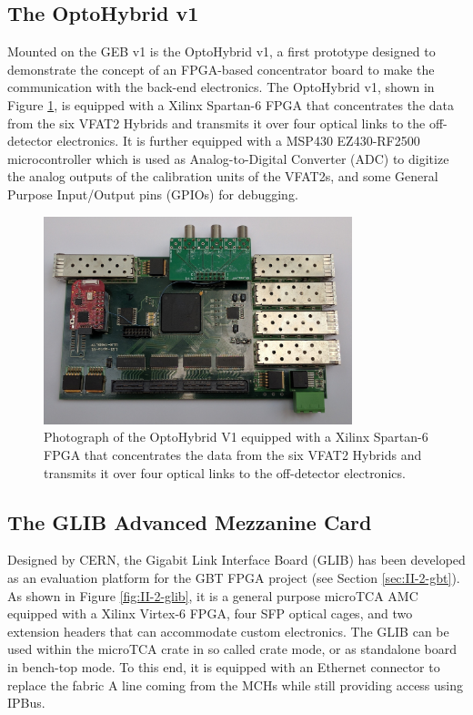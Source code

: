     \subsection{The OptoHybrid v1}

      Mounted on the GEB v1 is the OptoHybrid v1, a first prototype designed to demonstrate the concept of an FPGA-based concentrator board to make the communication with the back-end electronics. The OptoHybrid v1, shown in Figure \ref{fig:II-2-ohv1}, is equipped with a Xilinx Spartan-6 FPGA that concentrates the data from the six VFAT2 Hybrids and transmits it over four optical links to the off-detector electronics. It is further equipped with a MSP430 EZ430-RF2500 \cite{MSP430} microcontroller which is used as Analog-to-Digital Converter (ADC) to digitize the analog outputs of the calibration units of the VFAT2s, and some General Purpose Input/Output pins (GPIOs) for debugging.

      \begin{figure}[h!]
        \centering
        \includegraphics[width=0.8\textwidth]{img/II-2-daq/oh-v1.jpg}
        \caption{Photograph of the OptoHybrid V1 equipped with a Xilinx Spartan-6 FPGA that concentrates the data from the six VFAT2 Hybrids and transmits it over four optical links to the off-detector electronics.}
        \label{fig:II-2-ohv1}
      \end{figure}

    \subsection{The GLIB Advanced Mezzanine Card}

      Designed by CERN, the Gigabit Link Interface Board (GLIB) \cite{Vichoudis:1359270} has been developed as an evaluation platform for the GBT FPGA project (see Section \ref{sec:II-2-gbt}). As shown in Figure \ref{fig:II-2-glib}, it is a general purpose microTCA AMC equipped with a Xilinx Virtex-6 FPGA, four SFP optical cages, and two extension headers that can accommodate custom electronics. The GLIB can be used within the microTCA crate in so called crate mode, or as standalone board in bench-top mode. To this end, it is equipped with an Ethernet connector to replace the fabric A line coming from the MCHs while still providing access using IPBus. \\

